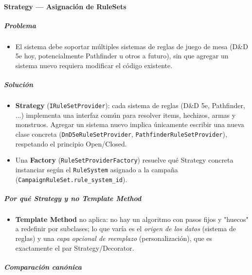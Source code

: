\paragraph{Strategy — Asignación de RuleSets}

\subparagraph{Problema}
\begin{itemize}[itemsep=2pt,topsep=2pt]
\item El sistema debe soportar múltiples sistemas de reglas de juego de mesa (D\&D 5e hoy, potencialmente Pathfinder u otros a futuro), sin que agregar un sistema nuevo requiera modificar el código existente.
\end{itemize}
\subparagraph{Solución}
\begin{itemize}[itemsep=2pt,topsep=2pt]
\item \textbf{Strategy} (\texttt{IRuleSetProvider}): cada sistema de reglas (D\&D 5e, Pathfinder, ...) implementa una interfaz común para resolver items, hechizos, armas y monstruos. Agregar un sistema nuevo implica únicamente escribir una nueva clase concreta (\texttt{DnD5eRuleSetProvider}, \texttt{PathfinderRuleSetProvider}), respetando el principio Open/Closed.
\item Una \textbf{Factory} (\texttt{RuleSetProviderFactory}) resuelve qué Strategy concreta instanciar según el \texttt{RuleSystem} asignado a la campaña (\texttt{CampaignRuleSet.\allowbreak{}rule\_\allowbreak{}system\_\allowbreak{}id}).
\end{itemize}
\subparagraph{Por qué Strategy y no Template Method}
\begin{itemize}[itemsep=2pt,topsep=2pt]
\item \textbf{Template Method} no aplica: no hay un algoritmo con pasos fijos y "huecos" a redefinir por subclases; lo que varía es el \textit{origen de los datos} (sistema de reglas) y una \textit{capa opcional de reemplazo} (personalización), que es exactamente el par Strategy/Decorator.
\end{itemize}
\subparagraph{Comparación canónica}
